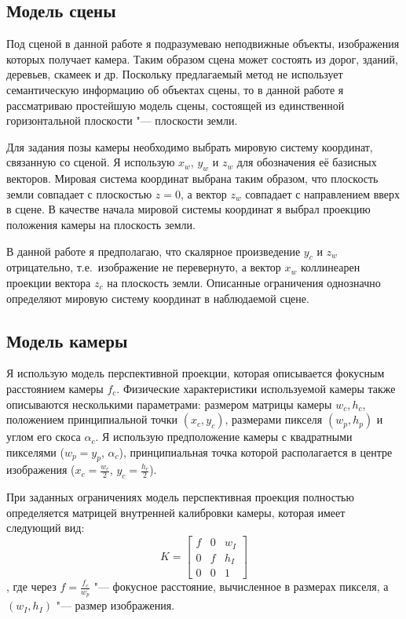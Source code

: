 \subsection{Модель сцены}

Под сценой в данной работе я подразумеваю неподвижные объекты, изображения которых получает камера. Таким образом сцена может состоять из дорог, зданий, деревьев, скамеек и др. Поскольку предлагаемый метод не использует семантическую информацию об объектах сцены, то в данной работе я рассматриваю простейшую модель сцены, состоящей из единственной горизонтальной плоскости "--- плоскости земли.

Для задания позы камеры необходимо выбрать мировую систему координат, связанную со сценой. Я использую $x_w$, $y_w$ и $z_w$ для обозначения её базисных векторов. Мировая система координат выбрана таким образом, что плоскость земли совпадает с плоскостью $z=0$, а вектор $z_w$ совпадает с направлением вверх в сцене. В качестве начала мировой системы координат я выбрал проекцию положения камеры на плоскость земли.

В данной работе я предполагаю, что скалярное произведение $y_c$ и $z_w$ отрицательно, т.е.~изображение не перевернуто, а вектор $x_w$ коллинеарен проекции вектора $z_c$ на плоскость земли. Описанные ограничения однозначно определяют мировую систему координат в наблюдаемой сцене.

\subsection{Модель камеры}

Я использую модель перспективной проекции, которая описывается фокусным расстоянием камеры $f_c$. Физические характеристики используемой камеры также описываются несколькими параметрами: размером матрицы камеры $w_c, h_c$, положением принципиальной точки $(x_c, y_c)$, размерами пикселя $(w_p, h_p)$ и углом его скоса $\alpha_c$. Я использую предположение камеры с квадратными пикселями ($w_p = y_p$, $\alpha_c$), принципиальная точка которой располагается в центре изображения ($x_c = \frac{w_c}{2}$, $y_c = \frac{h_c}{2}$).

При заданных ограничениях модель перспективная проекция полностью определяется матрицей внутренней калибровки камеры, которая имеет следующий вид:
\begin{equation}
	K = \left[
	\begin{matrix}
		f & 0 & w_I \\
		0 & f & h_I \\
		0 & 0 & 1
	\end{matrix} \right]
\end{equation},
где через $f = \frac{f_c}{w_p}$ "--- фокусное расстояние, вычисленное в размерах пикселя, а $(w_I, h_I)$ "--- размер изображения.

